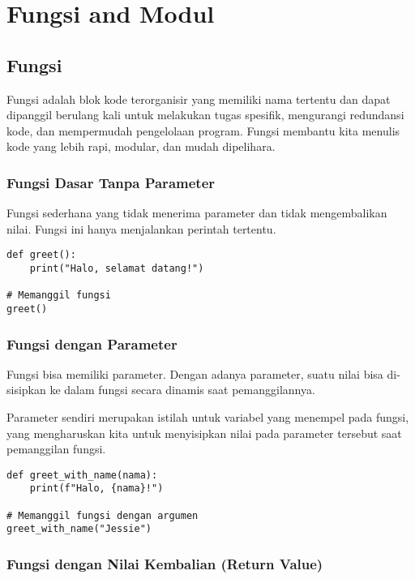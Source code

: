 \chapter{Fungsi and Modul}

\section{Fungsi}
Fungsi adalah blok kode terorganisir yang memiliki nama tertentu dan dapat dipanggil berulang kali untuk melakukan tugas spesifik, mengurangi redundansi kode, dan mempermudah pengelolaan program. Fungsi membantu kita menulis kode yang lebih rapi, modular, dan mudah dipelihara.

\subsection{Fungsi Dasar Tanpa Parameter}

Fungsi sederhana yang tidak menerima parameter dan tidak mengembalikan nilai. Fungsi ini hanya menjalankan perintah tertentu.

\begin{lstlisting}[style=PythonStyle, caption={Kode Python: basic_function.py}]
def greet():
    print("Halo, selamat datang!")

# Memanggil fungsi
greet()
\end{lstlisting}

\subsection{Fungsi dengan Parameter}

Fungsi bisa memiliki parameter. Dengan adanya parameter, suatu nilai bisa di-sisipkan ke dalam fungsi secara dinamis saat pemanggilannya.

Parameter sendiri merupakan istilah untuk variabel yang menempel pada fungsi, yang mengharuskan kita untuk menyisipkan nilai pada parameter tersebut saat pemanggilan fungsi.

\begin{lstlisting}[style=PythonStyle, caption={Kode Python: parameter_function.py}]
def greet_with_name(nama):
    print(f"Halo, {nama}!")

# Memanggil fungsi dengan argumen
greet_with_name("Jessie")
\end{lstlisting}

\subsection{Fungsi dengan Nilai Kembalian (Return Value)}

